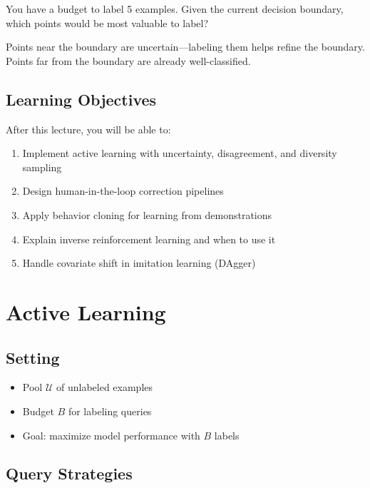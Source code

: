 You have a budget to label 5 examples. Given the current decision boundary, which points would be most valuable to label?

Points near the boundary are uncertain---labeling them helps refine the boundary. Points far from the boundary are already well-classified.

\subsection{Learning Objectives}

After this lecture, you will be able to:
\begin{enumerate}
    \item Implement active learning with uncertainty, disagreement, and diversity sampling
    \item Design human-in-the-loop correction pipelines
    \item Apply behavior cloning for learning from demonstrations
    \item Explain inverse reinforcement learning and when to use it
    \item Handle covariate shift in imitation learning (DAgger)
\end{enumerate}


\section{Active Learning}


\subsection{Setting}

\begin{itemize}
    \item Pool $\mathcal{U}$ of unlabeled examples
    \item Budget $B$ for labeling queries
    \item Goal: maximize model performance with $B$ labels
\end{itemize}

\subsection{Query Strategies}

